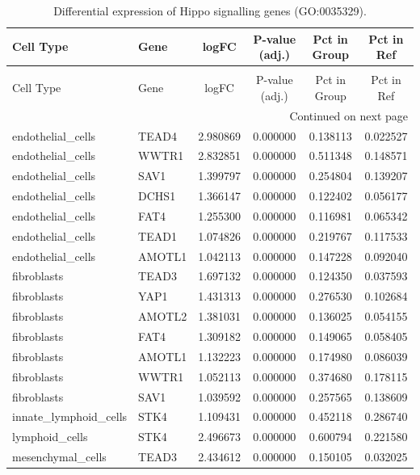 \begin{longtable}{llcccc}
\caption{Differential expression of Hippo signalling genes (GO:0035329).} \label{tab:hippo_deg} \\
\toprule
Cell Type & Gene & logFC & P-value (adj.) & Pct in Group & Pct in Ref \\
\midrule
\endfirsthead
\caption[]{Differential expression of Hippo signalling genes (GO:0035329).} \\
\toprule
Cell Type & Gene & logFC & P-value (adj.) & Pct in Group & Pct in Ref \\
\midrule
\endhead
\midrule
\multicolumn{6}{r}{Continued on next page} \\
\midrule
\endfoot
\bottomrule
\endlastfoot
endothelial_cells & TEAD4 & 2.980869 & 0.000000 & 0.138113 & 0.022527 \\
endothelial_cells & WWTR1 & 2.832851 & 0.000000 & 0.511348 & 0.148571 \\
endothelial_cells & SAV1 & 1.399797 & 0.000000 & 0.254804 & 0.139207 \\
endothelial_cells & DCHS1 & 1.366147 & 0.000000 & 0.122402 & 0.056177 \\
endothelial_cells & FAT4 & 1.255300 & 0.000000 & 0.116981 & 0.065342 \\
endothelial_cells & TEAD1 & 1.074826 & 0.000000 & 0.219767 & 0.117533 \\
endothelial_cells & AMOTL1 & 1.042113 & 0.000000 & 0.147228 & 0.092040 \\
fibroblasts & TEAD3 & 1.697132 & 0.000000 & 0.124350 & 0.037593 \\
fibroblasts & YAP1 & 1.431313 & 0.000000 & 0.276530 & 0.102684 \\
fibroblasts & AMOTL2 & 1.381031 & 0.000000 & 0.136025 & 0.054155 \\
fibroblasts & FAT4 & 1.309182 & 0.000000 & 0.149065 & 0.058405 \\
fibroblasts & AMOTL1 & 1.132223 & 0.000000 & 0.174980 & 0.086039 \\
fibroblasts & WWTR1 & 1.052113 & 0.000000 & 0.374680 & 0.178115 \\
fibroblasts & SAV1 & 1.039592 & 0.000000 & 0.257565 & 0.138609 \\
innate_lymphoid_cells & STK4 & 1.109431 & 0.000000 & 0.452118 & 0.286740 \\
lymphoid_cells & STK4 & 2.496673 & 0.000000 & 0.600794 & 0.221580 \\
mesenchymal_cells & TEAD3 & 2.434612 & 0.000000 & 0.150105 & 0.032025 \\

\end{longtable}
